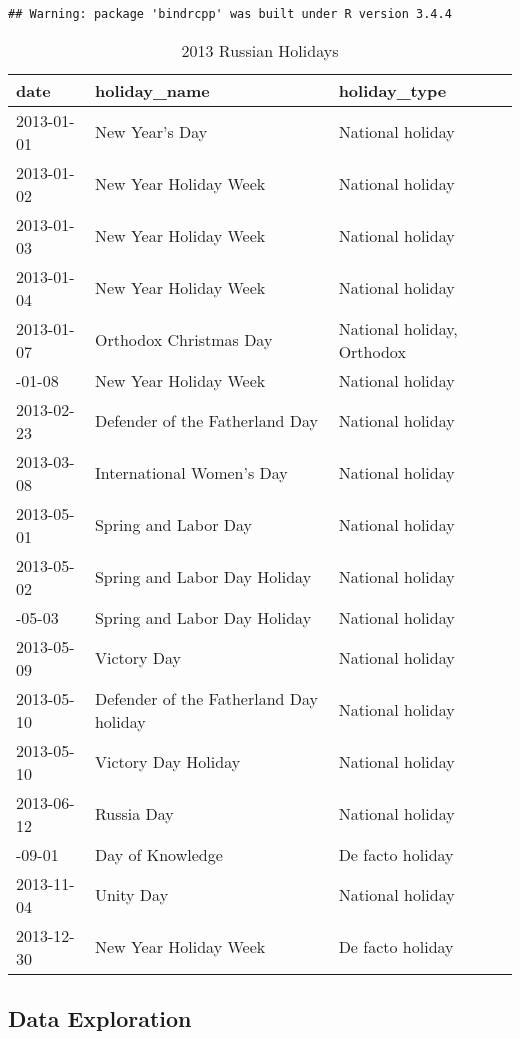 \documentclass[floatsintext,man]{apa6}
\theoremstyle{definition}
\theoremstyle{definition}
\theoremstyle{definition}
\theoremstyle{remark}
\begin{document}
\begin{verbatim}
## Warning: package 'bindrcpp' was built under R version 3.4.4
\end{verbatim}

\begin{table}[H]

\caption{\label{tab:unnamed-chunk-4}2013 Russian Holidays}
\centering
\begin{tabular}[t]{lll}
\toprule
date & holiday\_name & holiday\_type\\
\midrule
2013-01-01 & New Year's Day & National holiday\\
2013-01-02 & New Year Holiday Week & National holiday\\
2013-01-03 & New Year Holiday Week & National holiday\\
2013-01-04 & New Year Holiday Week & National holiday\\
2013-01-07 & Orthodox Christmas Day & National holiday, Orthodox\\
\addlinespace
2013-01-08 & New Year Holiday Week & National holiday\\
2013-02-23 & Defender of the Fatherland Day & National holiday\\
2013-03-08 & International Women's Day & National holiday\\
2013-05-01 & Spring and Labor Day & National holiday\\
2013-05-02 & Spring and Labor Day Holiday & National holiday\\
\addlinespace
2013-05-03 & Spring and Labor Day Holiday & National holiday\\
2013-05-09 & Victory Day & National holiday\\
2013-05-10 & Defender of the Fatherland Day holiday & National holiday\\
2013-05-10 & Victory Day Holiday & National holiday\\
2013-06-12 & Russia Day & National holiday\\
\addlinespace
2013-09-01 & Day of Knowledge & De facto holiday\\
2013-11-04 & Unity Day & National holiday\\
2013-12-30 & New Year Holiday Week & De facto holiday\\
\bottomrule
\end{tabular}
\end{table}

\subsection{Data Exploration}\label{data-exploration}
\end{document}
